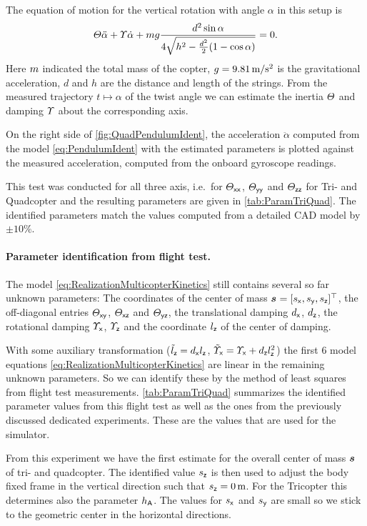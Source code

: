 The equation of motion for the vertical rotation with angle $\alpha$ in this setup is
\begin{align}\label{eq:PendulumIdent}
 \varTheta \ddot{\alpha} + \varUpsilon \dot{\alpha} + m g \frac{d^2 \sin\alpha}{4\sqrt{h^2 - \tfrac{d^2}{2}(1-\cos\alpha)}} = 0.
\end{align}
Here $m$ indicated the total mass of the copter, $g = 9.81\,\text{m} / \text{s}^2$ is the gravitational acceleration, $d$ and $h$ are the distance and length of the strings.
From the measured trajectory $t\mapsto\alpha$ of the twist angle we can estimate the inertia $\varTheta$ and damping $\varUpsilon$ about the corresponding axis.

On the right side of \autoref{fig:QuadPendulumIdent}, the acceleration $\ddot{\alpha}$ computed from the model \eqref{eq:PendulumIdent} with the estimated parameters is plotted against the measured acceleration, computed from the onboard gyroscope readings.

This test was conducted for all three axis, i.e.\ for $\varTheta_{\mathsf{x}\mathsf{x}}$, $\varTheta_{\mathsf{y}\mathsf{y}}$ and $\varTheta_{\mathsf{z}\mathsf{z}}$ for Tri- and Quadcopter and the resulting parameters are given in \autoref{tab:ParamTriQuad}.
The identified parameters match the values computed from a detailed CAD model by $\pm 10\%$.

\paragraph*{Parameter identification from flight test.}
The model \eqref{eq:RealizationMulticopterKinetics} still contains several so far unknown parameters:
The coordinates of the center of mass $\bodyCOM{}{}{} = [\sx, \sy, \sz]^\top$, the off-diagonal entries $\varTheta_{\mathsf{x}\mathsf{y}}$, $\varTheta_{\mathsf{x}\mathsf{z}}$ and $\varTheta_{\mathsf{y}\mathsf{z}}$, the translational damping $d_{\mathsf{x}}$, $d_{\mathsf{z}}$, the rotational damping $\varUpsilon_{\mathsf{x}}$, $\varUpsilon_{\mathsf{z}}$ and the coordinate $l_{\mathsf{z}}$ of the center of damping.

With some auxiliary transformation ($\tilde{l}_{\mathsf{z}} = d_{\mathsf{x}}l_{\mathsf{z}}$, $\tilde{\varUpsilon}_{\mathsf{x}} = \varUpsilon_{\mathsf{x}} + d_{\mathsf{z}}l_{\mathsf{z}}^2$) the first 6 model equations \eqref{eq:RealizationMulticopterKinetics} are linear in the remaining unknown parameters.
So we can identify these by the method of least squares from flight test measurements.
\autoref{tab:ParamTriQuad} summarizes the identified parameter values from this flight test as well as the ones from the previously discussed dedicated experiments.
These are the values that are used for the simulator.

From this experiment we have the first estimate for the overall center of mass $\bodyCOM{}{}{}$ of tri- and quadcopter.
The identified value $s_{\mathsf{z}}$ is then used to adjust the body fixed frame in the vertical direction such that $s_{\mathsf{z}}=0\,\text{m}$.
For the Tricopter this determines also the parameter $h_{\mathsf{A}}$.
The values for $s_{\mathsf{x}}$ and $s_{\mathsf{y}}$ are small so we stick to the geometric center in the horizontal directions.

